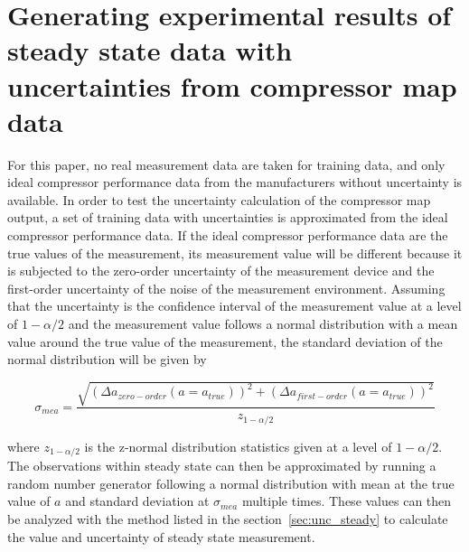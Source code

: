\section{Generating experimental results of steady state data with uncertainties from compressor map data}
\label{sec:approx_uncertainty}
For this paper, no real measurement data are taken for training data, and only ideal compressor performance data from the manufacturers without uncertainty is available. In order to test the uncertainty calculation of the compressor map output, a set of training data with uncertainties is approximated from the ideal compressor performance data. If the ideal compressor performance data are the true values of the measurement, its measurement value will be different because it is subjected to the zero-order uncertainty of the measurement device and the first-order uncertainty of the noise of the measurement environment.  Assuming that the uncertainty is the confidence interval of the measurement value at a level of $1-\alpha/2$ and the measurement value follows a normal distribution with a mean value around the true value of the measurement, the standard deviation of the normal distribution will be given by

\begin{equation}
{\sigma _{mea}} = \frac{{\sqrt {{{(\Delta {a_{zero - order}}(a = {a_{true}}))}^2} + {{(\Delta {a_{first - order}}(a = {a_{true}}))}^2}} }}{{{z_{1 - \alpha /2}}}}
\label{eq:std_norm}
\end{equation}

where $z_{1-\alpha/2}$ is the z-normal distribution statistics given at a level of ${1-\alpha/2}$. The observations within steady state can then be approximated by running a random number generator following a normal distribution with mean at the true value of $a$ and standard deviation at $\sigma_{mea}$ multiple times. These values can then be analyzed with the method listed in the section~\ref{sec:unc_steady} to calculate the value and uncertainty of steady state measurement.